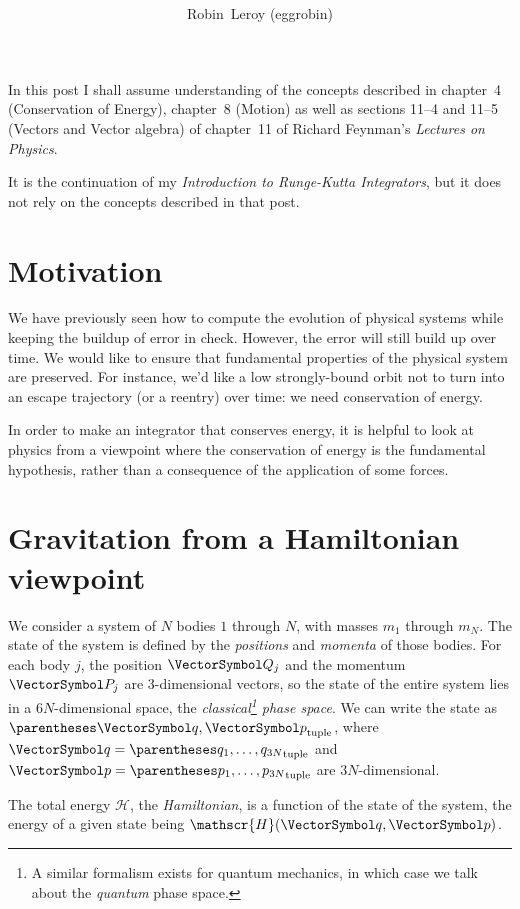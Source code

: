 \documentclass[10pt, a4paper, twoside]{basestyle}
\title{%
\textdisplay{%
A Short Introduction to Hamiltonian Mechanics}%
}
\author{Robin~Leroy (eggrobin)}
\begin{document}
\maketitle
In this post I shall assume understanding of the concepts described in
chapter~4 (Conservation of Energy), chapter~8 (Motion) as well as sections
11--4 and 11--5 (Vectors and Vector algebra) of chapter~11 of Richard
Feynman's \emph{Lectures on Physics}.

It is the continuation of my \emph{Introduction to Runge-Kutta Integrators},
but it does not rely on the concepts described in that post.

\section{Motivation}
We have previously seen how to compute the evolution of physical systems while
keeping the buildup of error in check. However, the error will still build up
over time. We would like to ensure that fundamental properties of the physical
system are preserved. For instance, we'd like a low strongly-bound orbit not to
turn into an escape trajectory (or a reentry) over time: we need conservation
of energy.

In order to make an integrator that conserves energy, it is helpful to look at
physics from a viewpoint where the conservation of energy is the fundamental
hypothesis, rather than a consequence of the application of some forces.

\newcommand{\Hamiltonian}{\mathscr{H}}
\section{Gravitation from a Hamiltonian viewpoint}
We consider a system of $N$ bodies $1$ through $N$, with masses $m_1$ through
$m_N$. The state of the system is defined by the \emph{positions} and
\emph{momenta} of those bodies. For each body $j$, the position $\vQ_j$ and the
momentum $\vP_j$ are 3-dimensional vectors, so the state of the entire system
lies in a $6N$-dimensional space, the \emph{classical\footnote{A similar
formalism exists for quantum mechanics, in which case we talk about the
\emph{quantum} phase space.} phase space}.
We can write the state as $\tuple{\vq, \vp}$, where $\vq = \tuple{q_1, \dotsc,
q_{3N}}$ and $\vp =  \tuple{p_1, \dotsc, p_{3N}}$ are $3N$-dimensional.

The total energy $\Hamiltonian$, the \emph{Hamiltonian}, is a function
of the state of the system, the energy of a given state being $\Hamiltonian(\vq,
\vp)$.
\end{document}
